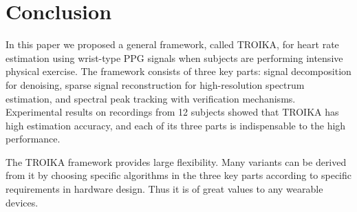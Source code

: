 \documentclass[10pt,twocolumn]{IEEEtran}
\begin{document}
\section{Conclusion}

In this paper we proposed a general framework, called TROIKA, for heart rate estimation using wrist-type PPG signals when subjects are performing intensive physical exercise. The framework consists of three key parts: signal decomposition for denoising, sparse signal reconstruction for high-resolution spectrum estimation, and spectral peak tracking with verification mechanisms. Experimental results on recordings from 12 subjects showed that TROIKA has high estimation accuracy, and each of its three parts is indispensable to the high performance.

The TROIKA framework provides large flexibility. Many variants can be derived from it by choosing specific algorithms in the three key parts according to specific requirements in hardware design. Thus it is of great values to any wearable devices.










\end{document}
